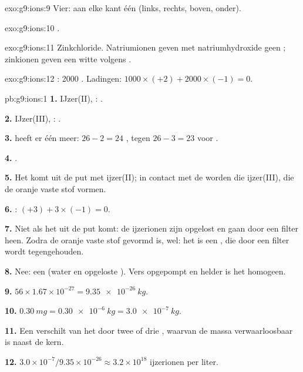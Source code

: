\begin{solution}{exo:g9:ions:9}
Vier: aan elke kant één (links, rechts, boven, onder).
\end{solution}

\begin{solution}{exo:g9:ions:10}
.
\end{solution}

\begin{solution}{exo:g9:ions:11}
Zinkchloride. Natriumionen geven met natriumhydroxide geen
; zinkionen geven een witte 
volgens .
\end{solution}

\begin{solution}{exo:g9:ions:12}
: 2000 . Ladingen: $1000 \times (+2) + 2000 \times
(-1) = 0$.
\end{solution}

\begin{solution}{pb:g9:ions:1}
\textbf{1.} IJzer(II), : .

\textbf{2.} IJzer(III), : .

\textbf{3.}  heeft er één meer: $26 - 2 = 24$ ,
tegen $26 - 3 = 23$ voor .

\textbf{4.} .

\textbf{5.} Het komt uit de put met ijzer(II); in contact met de
 worden die ijzer(III), die de oranje vaste stof vormen.

\textbf{6.} : $(+3) + 3 \times (-1) = 0$.

\textbf{7.} Niet als het uit de put komt: de ijzerionen zijn opgelost
en gaan door een filter heen. Zodra de oranje vaste stof gevormd is,
wel: het is een , die door een filter wordt tegengehouden.

\textbf{8.} Nee: een  (water en opgeloste ). Vers opgepompt
en helder is het homogeen.

\textbf{9.} $56 \times 1.67 \times 10^{-27} = \qty{9.35e-26}{kg}$.

\textbf{10.} $\qty{0.30}{mg} = \qty{0.30e-6}{kg} = \qty{3.0e-7}{kg}$.

\textbf{11.} Een  verschilt van het  door twee of drie
, waarvan de massa verwaarloosbaar is naast de kern.

\textbf{12.} $3.0 \times 10^{-7} / 9.35 \times 10^{-26} \approx 3.2
\times 10^{18}$ ijzerionen per liter.
\end{solution}
